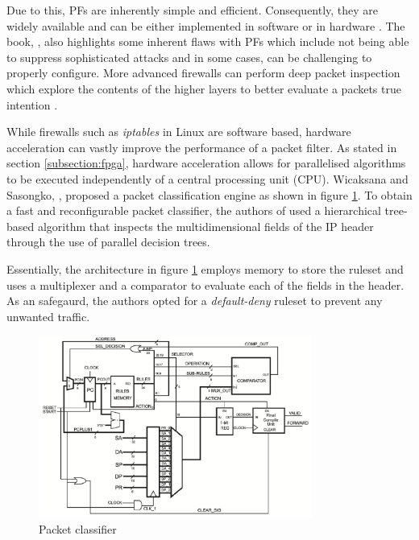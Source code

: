 Due to this, PFs are inherently simple and efficient. Consequently, they are widely available and can be either implemented in software or in 
hardware \cite{BuildingInternetFirewalls}. The book, \cite{BuildingInternetFirewalls}, also highlights some inherent flaws with PFs which include not being able 
to suppress sophisticated attacks and in some cases, can be challenging to properly configure. More advanced firewalls can perform deep packet inspection which 
explore the contents of the higher layers to better evaluate a packets true intention \cite{FirewallsBook}. 

While firewalls such as \textit{iptables} in Linux are software based, hardware acceleration can vastly improve the performance of a packet filter. As stated in section 
\ref{subsection:fpga}, hardware acceleration allows for parallelised algorithms to be executed independently of a central processing unit (CPU). Wicaksana and Sasongko, 
\cite{FastRecongifFPGAFirewall}, proposed a packet classification engine as shown in figure \ref{fig:fast-fpga-classifier}. To obtain a fast and reconfigurable packet 
classifier, the authors of \cite{FastRecongifFPGAFirewall} used a hierarchical tree-based algorithm that inspects the multidimensional fields of the IP header through 
the use of parallel decision trees.

Essentially, the architecture in figure \ref{fig:fast-fpga-classifier} employs memory to store the ruleset and uses a multiplexer and a comparator to evaluate each of the fields 
in the header. As an safegaurd, the authors opted for a \textit{default-deny} ruleset to prevent any unwanted traffic. 


\begin{figure}[h]
    \centering
    \includegraphics[width=0.8\textwidth]{Images/packetFilterHardware.png}
    \caption{Packet classifier \cite{FastRecongifFPGAFirewall}}
    \label{fig:fast-fpga-classifier}
\end{figure}



